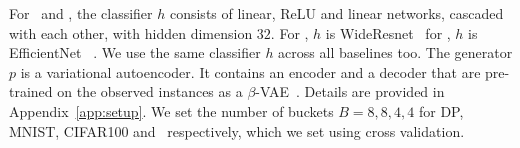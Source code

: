\documentclass[letterpaper]{article}
\renewcommand{\cite}{\citep}
\begin{document}

 For \dpr\ and \mnist, the classifier $h$ consists of  linear, ReLU  and linear networks, cascaded with each other, with hidden dimension $32$.
For \cifar, $h$ is WideResnet~\cite{zagoruyko2016wide} for \ti, $h$ is EfficientNet ~\cite{tan2021efficientnetv2}. We use the same classifier $h$ across all baselines too.
The generator $p$ is a variational autoencoder. It contains an encoder and a decoder that are pre-trained on the observed instances as a $\beta$-VAE~\cite{higgins2017beta}. Details are provided in Appendix~\ref{app:setup}. We set the number of buckets $B=8,8,4,4$  for DP, MNIST, CIFAR100 and \ti\ respectively, which we set using cross validation. 
\end{document}
